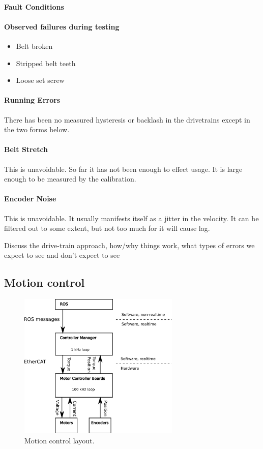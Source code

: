 \paragraph{Fault Conditions}
\paragraph{Observed failures during testing}
\begin{itemize}
\item Belt broken 
\item Stripped belt teeth
\item Loose set screw
\end{itemize}
\paragraph{Running Errors}
There has been no measured hysteresis or backlash in the drivetrains
except in the two forms below.  

\paragraph{Belt Stretch}
This is unavoidable.  So far it has not been enough to effect usage.
It is large enough to be measured by the calibration.
\paragraph{Encoder Noise}
This is unavoidable.  It usually manifests itself as a jitter in the
velocity.  It can be filtered out to some extent, but not too much for
it will cause lag.



Discuss the drive-train approach, how/why things work, what types of errors we expect to see and don't expect to see

\subsection{Motion control}


\begin{figure}[h]
\centering
\includegraphics[width=290px]{images/mechanism_control.png}
\caption{Motion control layout.}
\label{fig:motion_control}
\end{figure}


